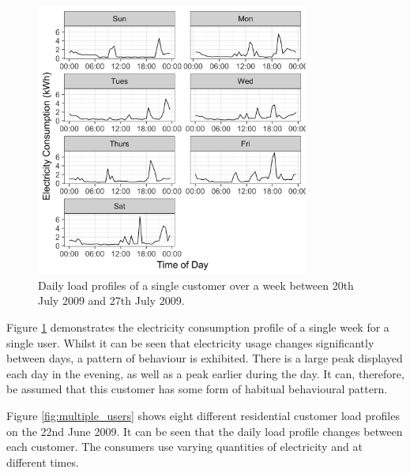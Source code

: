 \begin{figure}[b]
	\includegraphics[width=0.8\textwidth]{Chapter5/figures/short-term-forecasting/Rplot01.png}
	\caption{Daily load profiles of a single customer over a week between 20th July 2009 and 27th July 2009. }
	\label{fig:single_user}
\end{figure}

Figure \ref{fig:single_user} demonstrates the electricity consumption profile of a single week for a single user. Whilst it can be seen that electricity usage changes significantly between days, a pattern of behaviour is exhibited. There is a large peak displayed each day in the evening, as well as a peak earlier during the day. It can, therefore, be assumed that this customer has some form of habitual behavioural pattern. 

Figure \ref{fig:multiple_users} shows eight different residential customer load profiles on the 22nd June 2009. It can be seen that the daily load profile changes between each customer. The consumers use varying quantities of electricity and at different times. 




